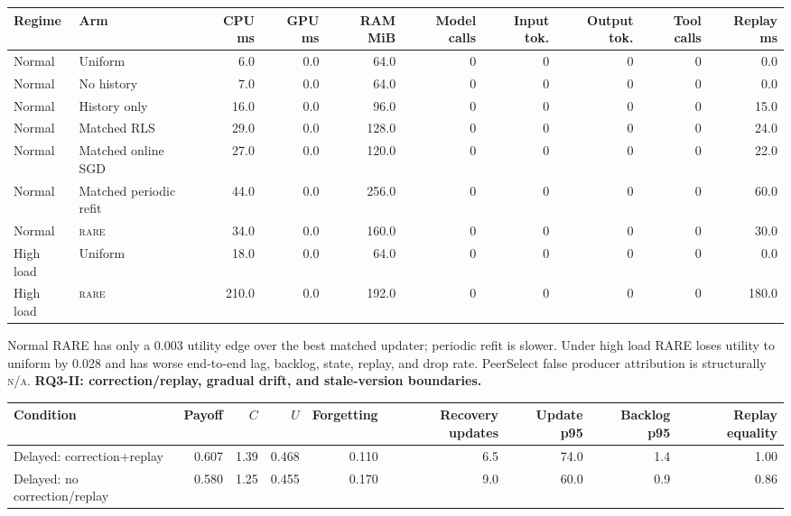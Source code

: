 \documentclass[10pt,a4paper,landscape]{article}
\newcommand{\rare}{\textsc{rare}}\newcommand{\na}{\textsc{n/a}}\newcommand{\nog}{\textsc{no-go}}\newcommand{\ok}{\textsc{pass}}
\begin{document}
\begin{center}\scriptsize\begin{tabular}{llrrrrrrrr}\toprule Regime & Arm & CPU ms & GPU ms & RAM MiB & Model calls & Input tok. & Output tok. & Tool calls & Replay ms \\\midrule
Normal & Uniform & 6.0 & 0.0 & 64.0 & 0 & 0 & 0 & 0 & 0.0 \\

Normal & No history & 7.0 & 0.0 & 64.0 & 0 & 0 & 0 & 0 & 0.0 \\

Normal & History only & 16.0 & 0.0 & 96.0 & 0 & 0 & 0 & 0 & 15.0 \\

Normal & Matched RLS & 29.0 & 0.0 & 128.0 & 0 & 0 & 0 & 0 & 24.0 \\

Normal & Matched online SGD & 27.0 & 0.0 & 120.0 & 0 & 0 & 0 & 0 & 22.0 \\

Normal & Matched periodic refit & 44.0 & 0.0 & 256.0 & 0 & 0 & 0 & 0 & 60.0 \\

Normal & \rare{} & 34.0 & 0.0 & 160.0 & 0 & 0 & 0 & 0 & 30.0 \\

High load & Uniform & 18.0 & 0.0 & 64.0 & 0 & 0 & 0 & 0 & 0.0 \\

High load & \rare{} & 210.0 & 0.0 & 192.0 & 0 & 0 & 0 & 0 & 180.0 \\

\bottomrule\end{tabular}\end{center}
Normal RARE has only a 0.003 utility edge over the best matched updater; periodic refit is slower. Under high load RARE loses utility to uniform by 0.028 and has worse end-to-end lag, backlog, state, replay, and drop rate. PeerSelect false producer attribution is structurally \na{}.
\textbf{RQ3-II: correction/replay, gradual drift, and stale-version boundaries.}
\begin{center}\scriptsize\begin{tabular}{lrrrrrrrr}\toprule Condition & Payoff & $C$ & $U$ & Forgetting & Recovery updates & Update p95 & Backlog p95 & Replay equality \\\midrule
Delayed: correction+replay & 0.607 & 1.39 & 0.468 & 0.110 & 6.5 & 74.0 & 1.4 & 1.00 \\

Delayed: no correction/replay & 0.580 & 1.25 & 0.455 & 0.170 & 9.0 & 60.0 & 0.9 & 0.86 \\

\bottomrule\end{tabular}\end{center}
\end{document}
